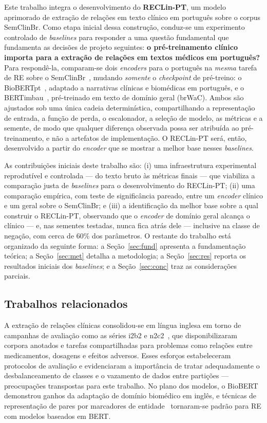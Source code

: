 \documentclass[12pt]{article}
\begin{document}
Este trabalho integra o desenvolvimento do \textbf{RECLin-PT}, um modelo
aprimorado de extração de relações em texto clínico em português sobre o corpus
SemClinBr. Como etapa inicial dessa construção, conduz-se um experimento
controlado de \emph{baselines} para responder a uma questão fundamental que
fundamenta as decisões de projeto seguintes: \textbf{o pré-treinamento clínico
importa para a extração de relações em textos médicos em português?} Para
respondê-la, comparam-se dois \emph{encoders} para o português na \emph{mesma}
tarefa de RE sobre o SemClinBr~\cite{oliveira:22}, mudando \emph{somente} o
\emph{checkpoint} de pré-treino: o BioBERTpt~\cite{schneider:20}, adaptado a
narrativas clínicas e biomédicas em português, e o BERTimbau~\cite{souza:20},
pré-treinado em texto de domínio geral (brWaC). Ambos são ajustados sob uma única
cadeia determinística, compartilhando a representação de entrada, a função de
perda, o escalonador, a seleção de modelo, as métricas e a semente, de modo que
qualquer diferença observada possa ser atribuída ao pré-treinamento, e não a
artefatos de implementação. O RECLin-PT será, então, desenvolvido a partir do
\emph{encoder} que se mostrar a melhor base nesses \emph{baselines}.

As contribuições iniciais deste trabalho são: (i) uma infraestrutura
experimental reprodutível e controlada --- do texto bruto às métricas finais ---
que viabiliza a comparação justa de \emph{baselines} para o desenvolvimento do
RECLin-PT; (ii) uma comparação empírica, com teste de significância pareado,
entre um \emph{encoder} clínico e um geral sobre o SemClinBr; e (iii) a
identificação da melhor base sobre a qual construir o RECLin-PT, observando que o
\emph{encoder} de domínio geral alcança o clínico --- e, nas sementes testadas,
nunca fica atrás dele --- inclusive na classe de negação, com cerca de 60\% dos
parâmetros. O restante do trabalho está
organizado da seguinte forma: a Seção~\ref{sec:fund} apresenta a fundamentação
teórica; a Seção~\ref{sec:met} detalha a metodologia; a Seção~\ref{sec:res}
reporta os resultados iniciais dos \emph{baselines}; e a
Seção~\ref{sec:conc} traz as considerações parciais.

\subsection{Trabalhos relacionados}
A extração de relações clínicas consolidou-se em língua inglesa em torno de
campanhas de avaliação como as séries i2b2 e n2c2~\cite{uzuner:11}, que
disponibilizaram corpora anotados e tarefas compartilhadas para problemas como
relações entre medicamentos, dosagens e efeitos adversos. Esses esforços
estabeleceram protocolos de avaliação e evidenciaram a importância de tratar
adequadamente o desbalanceamento de classes e o vazamento de dados entre
partições --- preocupações transpostas para este trabalho. No plano dos modelos,
o BioBERT~\cite{lee:20} demonstrou ganhos da adaptação de domínio biomédico em
inglês, e técnicas de representação de pares por marcadores de
entidade~\cite{soares:19} tornaram-se padrão para RE com modelos baseados em
BERT.
\end{document}
